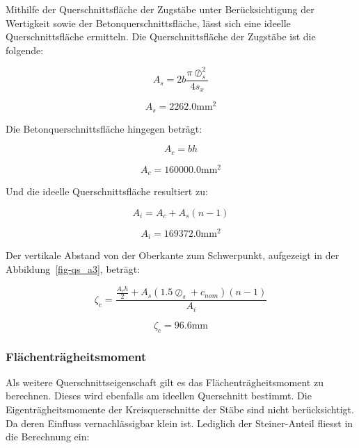 \documentclass[
  12pt,
  letterpaper,
  egregdoesnotlikesansseriftitles]{scrreprt}
\begin{document}
Mithilfe der Querschnittsfläche der Zugstäbe unter Berücksichtigung der
Wertigkeit sowie der Betonquerschnittsfläche, lässt sich eine ideelle
Querschnittsfläche ermitteln. Die Querschnittsfläche der Zugstäbe ist
die folgende:

\begin{equation}A_{s} = 2 b \frac{\pi \oslash_{s}^{2}}{4 s_{x}}\end{equation}

\begin{equation}A_{s} = 2262.0 \text{mm}^{2}\end{equation}

Die Betonquerschnittsfläche hingegen beträgt:

\begin{equation}A_{c} = b h\end{equation}

\begin{equation}A_{c} = 160000.0 \text{mm}^{2}\end{equation}

Und die ideelle Querschnittsfläche resultiert zu:

\begin{equation}A_{i} = A_{c} + A_{s} \left(n - 1\right)\end{equation}

\begin{equation}A_{i} = 169372.0 \text{mm}^{2}\end{equation}

Der vertikale Abstand von der Oberkante zum Schwerpunkt, aufgezeigt in
der Abbildung~\ref{fig-qs_a3}, beträgt:

\begin{equation}\zeta_{c} = \frac{\frac{A_{c} h}{2} + A_{s} \left(1.5 \oslash_{s} + c_{nom}\right) \left(n - 1\right)}{A_{i}}\end{equation}

\begin{equation}\zeta_{c} = 96.6 \text{mm}\end{equation}

\hypertarget{fluxe4chentruxe4gheitsmoment}{%
\subsubsection{Flächenträgheitsmoment}\label{fluxe4chentruxe4gheitsmoment}}

Als weitere Querschnittseigenschaft gilt es das Flächenträgheitsmoment
zu berechnen. Dieses wird ebenfalls am ideellen Querschnitt bestimmt.
Die Eigenträgheitsmomente der Kreisquerschnitte der Stäbe sind nicht
berücksichtigt. Da deren Einfluss vernachlässigbar klein ist. Lediglich
der Steiner-Anteil fliesst in die Berechnung ein:
\end{document}
